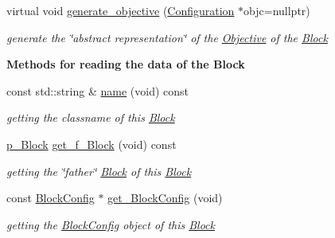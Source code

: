 \begin{Indent}
\begin{DoxyCompactItemize}
virtual void \mbox{\hyperlink{class_s_m_spp__di__unipi__it_1_1_block_ae14038d64cf6067f15cf3f53fd7af9e0}{generate\+\_\+objective}} (\mbox{\hyperlink{class_s_m_spp__di__unipi__it_1_1_configuration}{Configuration}} $\ast$objc=nullptr)
\begin{DoxyCompactList}\small\item\em generate the \char`\"{}abstract representation\char`\"{} of the \mbox{\hyperlink{class_s_m_spp__di__unipi__it_1_1_objective}{Objective}} of the \mbox{\hyperlink{class_s_m_spp__di__unipi__it_1_1_block}{Block}} \end{DoxyCompactList}\end{DoxyCompactItemize}
\end{Indent}
\begin{Indent}\textbf{ Methods for reading the data of the Block}\par
\begin{DoxyCompactItemize}
\item 
const std\+::string \& \mbox{\hyperlink{class_s_m_spp__di__unipi__it_1_1_block_a738e9dfd6e00507da219e4bd5a3f6be9}{name}} (void) const
\begin{DoxyCompactList}\small\item\em getting the classname of this \mbox{\hyperlink{class_s_m_spp__di__unipi__it_1_1_block}{Block}} \end{DoxyCompactList}\item 
\mbox{\label{class_s_m_spp__di__unipi__it_1_1_block_a02ca81fb18946d7ab09e93549a12b02f}} 
\mbox{\hyperlink{group___block___t_y_p_e_s_ga753932d88360bdd26edd3ad0397c99f9}{p\+\_\+\+Block}} \mbox{\hyperlink{class_s_m_spp__di__unipi__it_1_1_block_a02ca81fb18946d7ab09e93549a12b02f}{get\+\_\+f\+\_\+\+Block}} (void) const
\begin{DoxyCompactList}\small\item\em getting the \char`\"{}father\char`\"{} \mbox{\hyperlink{class_s_m_spp__di__unipi__it_1_1_block}{Block}} of this \mbox{\hyperlink{class_s_m_spp__di__unipi__it_1_1_block}{Block}} \end{DoxyCompactList}\item 
const \mbox{\hyperlink{class_s_m_spp__di__unipi__it_1_1_block_config}{Block\+Config}} $\ast$ \mbox{\hyperlink{class_s_m_spp__di__unipi__it_1_1_block_aff77eeb7e486daeeb142f0548478e8e3}{get\+\_\+\+Block\+Config}} (void)
\begin{DoxyCompactList}\small\item\em getting the \mbox{\hyperlink{class_s_m_spp__di__unipi__it_1_1_block_config}{Block\+Config}} object of this \mbox{\hyperlink{class_s_m_spp__di__unipi__it_1_1_block}{Block}} \end{DoxyCompactList}\item 

\end{DoxyCompactItemize}
\end{Indent}
